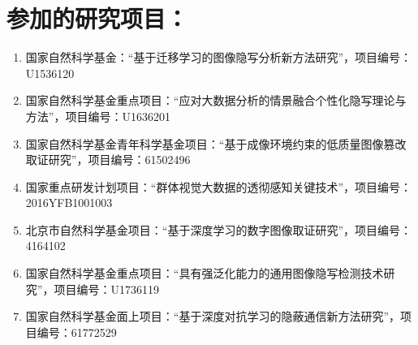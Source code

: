 \section*{参加的研究项目：}

\begin{enumerate}
	\item 国家自然科学基金：“基于迁移学习的图像隐写分析新方法研究”，项目编号：U1536120

	\item 国家自然科学基金重点项目：“应对大数据分析的情景融合个性化隐写理论与方法”，项目编号：U1636201

	\item 国家自然科学基金青年科学基金项目：“基于成像环境约束的低质量图像篡改取证研究”，项目编号：61502496

	\item 国家重点研发计划项目：“群体视觉大数据的透彻感知关键技术”，项目编号：2016YFB1001003

	\item 北京市自然科学基金项目：“基于深度学习的数字图像取证研究”，项目编号：4164102

	\item 国家自然科学基金重点项目：“具有强泛化能力的通用图像隐写检测技术研究”，项目编号：U1736119

	\item 国家自然科学基金面上项目：“基于深度对抗学习的隐蔽通信新方法研究”，项目编号：61772529

\end{enumerate}

